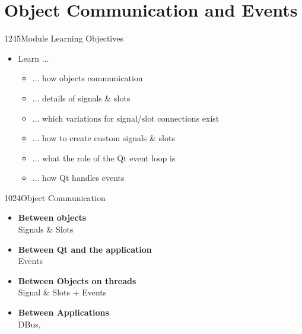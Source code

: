 %
%
%
%

\section{Object Communication and Events}

\begin{slide}{1245}{Module Learning Objectives}
\begin{itemize}
\item Learn ...
  \begin{itemize}
  \item ... how objects communication
  \item ... details of signals \& slots
  \item ... which variations for signal/slot connections exist
  \item ... how to create custom signals \& slots
  \item ... what the role of the Qt event loop is
  \item ... how Qt handles events
  \end{itemize}
\end{itemize}

\end{slide}


\begin{slide}{1024}{Object Communication}
\begin{itemize}
  \item \textbf{Between objects}\\
    Signals \& Slots\medskip
  \item \textbf{Between Qt and the application}\\
    Events\medskip
  \item \textbf{Between Objects on threads}\\
    Signal \& Slots + Events\medskip
  \item \textbf{Between Applications}\\
    DBus, 
\end{itemize}

\end{slide}






